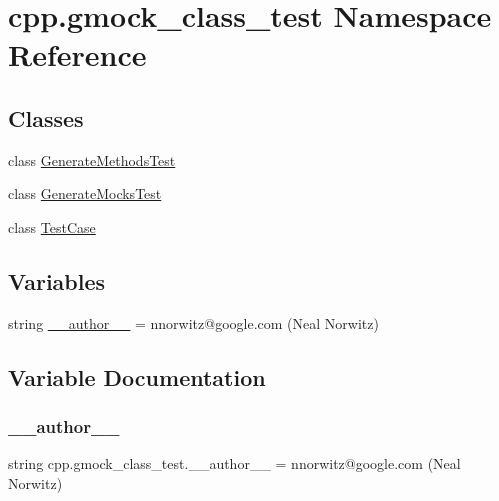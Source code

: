 \hypertarget{namespacecpp_1_1gmock__class__test}{}\section{cpp.\+gmock\+\_\+class\+\_\+test Namespace Reference}
\label{namespacecpp_1_1gmock__class__test}
\subsection*{Classes}
\begin{DoxyCompactItemize}
\item 
class \mbox{\hyperlink{classcpp_1_1gmock__class__test_1_1_generate_methods_test}{Generate\+Methods\+Test}}
\item 
class \mbox{\hyperlink{classcpp_1_1gmock__class__test_1_1_generate_mocks_test}{Generate\+Mocks\+Test}}
\item 
class \mbox{\hyperlink{classcpp_1_1gmock__class__test_1_1_test_case}{Test\+Case}}
\end{DoxyCompactItemize}
\subsection*{Variables}
\begin{DoxyCompactItemize}
\item 
string \mbox{\hyperlink{namespacecpp_1_1gmock__class__test_a72474ac6fe2295f91f383e45b9b6e536}{\+\_\+\+\_\+author\+\_\+\+\_\+}} = \textquotesingle{}nnorwitz@google.\+com (Neal Norwitz)\textquotesingle{}
\end{DoxyCompactItemize}


\subsection{Variable Documentation}
\mbox{\label{namespacecpp_1_1gmock__class__test_a72474ac6fe2295f91f383e45b9b6e536}} 
\subsubsection{\texorpdfstring{\_\_author\_\_}{\_\_author\_\_}}
{\footnotesize\ttfamily string cpp.\+gmock\+\_\+class\+\_\+test.\+\_\+\+\_\+author\+\_\+\+\_\+ = \textquotesingle{}nnorwitz@google.\+com (Neal Norwitz)\textquotesingle{}\hspace{0.3cm}{\ttfamily [private]}}

